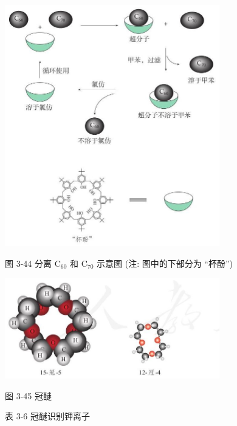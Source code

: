 \documentclass[10pt]{article}
\begin{document}
\begin{center}
\includegraphics[max width=0.7\textwidth]{images/0190e026-5a11-7df7-bd27-54d09026ba7a_102_173714.jpg}
\end{center}

图 3-44 分离 \({\mathrm{C}}_{60}\) 和 \({\mathrm{C}}_{70}\) 示意图 (注: 图中的下部分为 “杯酚”)

\begin{center}
\includegraphics[max width=0.7\textwidth]{images/0190e026-5a11-7df7-bd27-54d09026ba7a_102_950380.jpg}
\end{center}

图 3-45 冠醚

表 3-6 冠醚识别钾离子
\end{document}
